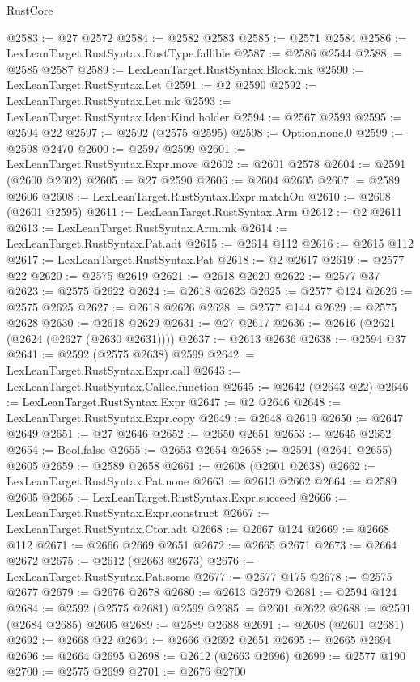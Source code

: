 \begin{lexlean}{RustCore}
\begin{coremodule}
@2583 := @27 @2572
@2584 := @2582 @2583
@2585 := @2571 @2584
@2586 := LexLeanTarget.RustSyntax.RustType.fallible
@2587 := @2586 @2544
@2588 := @2585 @2587
@2589 := LexLeanTarget.RustSyntax.Block.mk
@2590 := LexLeanTarget.RustSyntax.Let
@2591 := @2 @2590
@2592 := LexLeanTarget.RustSyntax.Let.mk
@2593 := LexLeanTarget.RustSyntax.IdentKind.holder
@2594 := @2567 @2593
@2595 := @2594 @22
@2597 := @2592 (@2575 @2595)
@2598 := Option.none.{0}
@2599 := @2598 @2470
@2600 := @2597 @2599
@2601 := LexLeanTarget.RustSyntax.Expr.move
@2602 := @2601 @2578
@2604 := @2591 (@2600 @2602)
@2605 := @27 @2590
@2606 := @2604 @2605
@2607 := @2589 @2606
@2608 := LexLeanTarget.RustSyntax.Expr.matchOn
@2610 := @2608 (@2601 @2595)
@2611 := LexLeanTarget.RustSyntax.Arm
@2612 := @2 @2611
@2613 := LexLeanTarget.RustSyntax.Arm.mk
@2614 := LexLeanTarget.RustSyntax.Pat.adt
@2615 := @2614 @112
@2616 := @2615 @112
@2617 := LexLeanTarget.RustSyntax.Pat
@2618 := @2 @2617
@2619 := @2577 @22
@2620 := @2575 @2619
@2621 := @2618 @2620
@2622 := @2577 @37
@2623 := @2575 @2622
@2624 := @2618 @2623
@2625 := @2577 @124
@2626 := @2575 @2625
@2627 := @2618 @2626
@2628 := @2577 @144
@2629 := @2575 @2628
@2630 := @2618 @2629
@2631 := @27 @2617
@2636 := @2616 (@2621 (@2624 (@2627 (@2630 @2631))))
@2637 := @2613 @2636
@2638 := @2594 @37
@2641 := @2592 (@2575 @2638) @2599
@2642 := LexLeanTarget.RustSyntax.Expr.call
@2643 := LexLeanTarget.RustSyntax.Callee.function
@2645 := @2642 (@2643 @22)
@2646 := LexLeanTarget.RustSyntax.Expr
@2647 := @2 @2646
@2648 := LexLeanTarget.RustSyntax.Expr.copy
@2649 := @2648 @2619
@2650 := @2647 @2649
@2651 := @27 @2646
@2652 := @2650 @2651
@2653 := @2645 @2652
@2654 := Bool.false
@2655 := @2653 @2654
@2658 := @2591 (@2641 @2655) @2605
@2659 := @2589 @2658
@2661 := @2608 (@2601 @2638)
@2662 := LexLeanTarget.RustSyntax.Pat.none
@2663 := @2613 @2662
@2664 := @2589 @2605
@2665 := LexLeanTarget.RustSyntax.Expr.succeed
@2666 := LexLeanTarget.RustSyntax.Expr.construct
@2667 := LexLeanTarget.RustSyntax.Ctor.adt
@2668 := @2667 @124
@2669 := @2668 @112
@2671 := @2666 @2669 @2651
@2672 := @2665 @2671
@2673 := @2664 @2672
@2675 := @2612 (@2663 @2673)
@2676 := LexLeanTarget.RustSyntax.Pat.some
@2677 := @2577 @175
@2678 := @2575 @2677
@2679 := @2676 @2678
@2680 := @2613 @2679
@2681 := @2594 @124
@2684 := @2592 (@2575 @2681) @2599
@2685 := @2601 @2622
@2688 := @2591 (@2684 @2685) @2605
@2689 := @2589 @2688
@2691 := @2608 (@2601 @2681)
@2692 := @2668 @22
@2694 := @2666 @2692 @2651
@2695 := @2665 @2694
@2696 := @2664 @2695
@2698 := @2612 (@2663 @2696)
@2699 := @2577 @190
@2700 := @2575 @2699
@2701 := @2676 @2700

\end{coremodule}
\end{lexlean}
